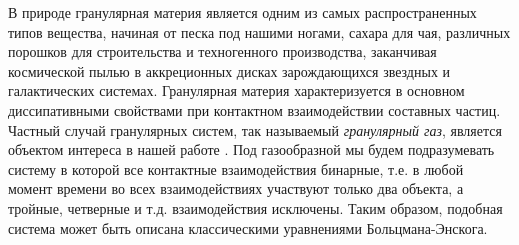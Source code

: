 \Introduction

В природе гранулярная материя является одним из самых распространенных типов вещества, начиная от песка под нашими ногами,
сахара для чая, различных порошков для строительства и техногенного производства, заканчивая космической пылью в аккреционных дисках 
зарождающихся звездных и галактических системах. 
Гранулярная материя характеризуется в основном диссипативными свойствами при контактном
взаимодействии составных частиц. Частный случай гранулярных систем, так называемый \emph{гранулярный газ}, является объектом интереса
в нашей работе \cite{Brilliantov:2004book}. Под газообразной мы будем подразумевать систему в которой все контактные взаимодействия бинарные, 
т.е. в любой момент времени во всех взаимодействиях участвуют только два объекта, а тройные, четверные и т.д. взаимодействия исключены.
Таким образом, подобная система может быть описана классическими уравнениями Больцмана-Энскога.

